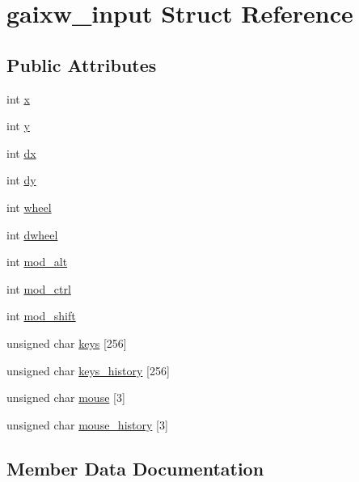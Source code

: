 \hypertarget{structgaixw__input}{}\section{gaixw\+\_\+input Struct Reference}
\label{structgaixw__input}
\subsection*{Public Attributes}
\begin{DoxyCompactItemize}
\item 
int \hyperlink{structgaixw__input_adf849b2f92f76151cfad6633fde93279}{x}
\item 
int \hyperlink{structgaixw__input_a8b654effdd08d54fc8664aa2b89294ff}{y}
\item 
int \hyperlink{structgaixw__input_a676ed5ef08464952452a00774ac306fc}{dx}
\item 
int \hyperlink{structgaixw__input_a6635cb3b3ef5f868a620069f20e368b6}{dy}
\item 
int \hyperlink{structgaixw__input_ae6229830f34a6c71c9c5ffad8a199f77}{wheel}
\item 
int \hyperlink{structgaixw__input_a3e39744e481ed17148ff4d5004aa1f36}{dwheel}
\item 
int \hyperlink{structgaixw__input_a14006c83a4700a575b76d90e2693d259}{mod\+\_\+alt}
\item 
int \hyperlink{structgaixw__input_a3c44cc64408bb151f4046466c058481d}{mod\+\_\+ctrl}
\item 
int \hyperlink{structgaixw__input_a072cf4077b4a97d359c603410ef97ec8}{mod\+\_\+shift}
\item 
unsigned char \hyperlink{structgaixw__input_ab0a6fb70cf772d62d05bce47884256cb}{keys} \mbox{[}256\mbox{]}
\item 
unsigned char \hyperlink{structgaixw__input_aeefc7998758b3f5783de412a70e9e0ca}{keys\+\_\+history} \mbox{[}256\mbox{]}
\item 
unsigned char \hyperlink{structgaixw__input_a73c877dd3212ebf00859ecbf940fef3c}{mouse} \mbox{[}3\mbox{]}
\item 
unsigned char \hyperlink{structgaixw__input_a9df96117629476b37b2666b4b60650f8}{mouse\+\_\+history} \mbox{[}3\mbox{]}
\end{DoxyCompactItemize}


\subsection{Member Data Documentation}
\mbox{\label{structgaixw__input_a3e39744e481ed17148ff4d5004aa1f36}} 
